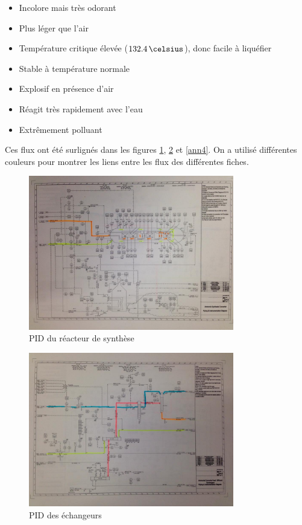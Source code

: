 \begin{enumerate}
\begin{itemize}
\item Incolore mais très odorant
\item Plus léger que l’air
\item Température critique élevée ($132.4\,\celsius$), donc facile à liquéfier
\item Stable à température normale
\item Explosif en présence d’air
\item Réagit très rapidement avec l’eau
\item Extrêmement polluant
\end{itemize}
\end{enumerate}

Ces flux ont été surlignés dans les figures \ref{ann2}, \ref{ann3} et \ref{ann4}. On a utilisé différentes couleurs pour montrer les liens entre les flux des différentes fiches.


\begin{figure}
\centering
\includegraphics[width=0.8\textwidth]{img/hazop1}
\caption{PID du réacteur de synthèse}
\label{ann2}
\end{figure}

\begin{figure}
\centering
\includegraphics[width=0.8\textwidth]{img/hazop2}
\caption{PID des échangeurs}
\label{ann3}
\end{figure}

